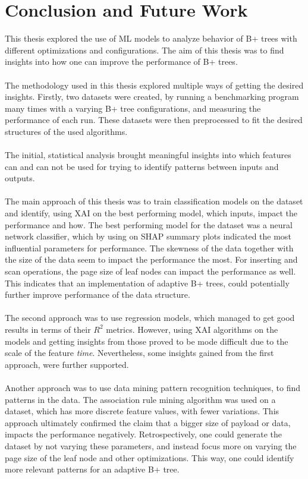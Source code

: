 \chapter{Conclusion and Future Work }\label{chapter:summary}
This thesis explored the use of \ac{ML} models to analyze behavior of B+ trees with different optimizations and configurations. The aim of this thesis was to find insights into how one can improve the performance of B+ trees.
\\\\
The methodology used in this thesis explored multiple ways of getting the desired insights. Firstly, two datasets were created, by running a benchmarking program many times with a varying B+ tree configurations, and measuring the performance of each run. These datasets were then preprocessed to fit the desired structures of the used algorithms.
\\\\
The initial, statistical analysis brought meaningful insights into which features can and can not be used for trying to identify patterns between inputs and outputs.
\\\\
The main approach of this thesis was to train classification models on the dataset and identify, using \ac{XAI} on the best performing model, which inputs, impact the performance and how. The best performing model for the dataset was a neural network classifier, which by using on SHAP summary plots indicated the most influential parameters for performance. The skewness of the data together with the size of the data seem to impact the performance the most. For inserting and scan operations, the page size of leaf nodes can impact the performance as well. This indicates that an implementation of adaptive B+ trees, could potentially further improve performance of the data structure.
\\\\
The second approach was to use regression models, which managed to get good results in terms of their $R^2$ metrics. However, using \ac{XAI} algorithms on the models and getting insights from those proved to be mode difficult due to the scale of the feature \textit{time}. Nevertheless, some insights gained from the first approach, were further supported.
\\\\
Another approach was to use data mining pattern recognition techniques, to find patterns in the data. The association rule mining algorithm was used on a dataset, which has more discrete feature values, with fewer variations. This approach ultimately confirmed the claim that a bigger size of payload or data, impacts the performance negatively. Retrospectively, one could generate the dataset by not varying these parameters, and instead focus more on varying the page size of the leaf node and other optimizations. This way, one could identify more relevant patterns for an adaptive B+ tree. 

